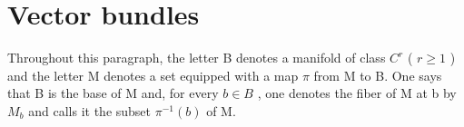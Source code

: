 \section{Vector bundles}

Throughout this paragraph, the letter B denotes a manifold of class \(C^{r}\) ( \(r \geqslant 1\) ) and the letter M denotes a set equipped with a map \(\pi\) from M to B. One says that B is the base of M and, for every \(b \in B\) , one denotes the fiber of M at b by \(M_{b}\) and calls it the subset \(\pi^{-1}(b)\) of M.
\relax{}
